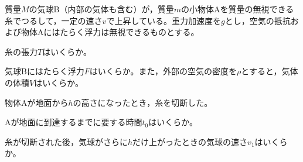 \item
\begin{mawarikomi}{50pt}{}
質量$M$の気球B（内部の気体も含む）が，質量$m$の小物体Aを質量の無視できる糸でつるして，一定の速さ$v$で上昇している。重力加速度を$g$とし，空気の抵抗および物体Aにはたらく浮力は無視できるものとする。
    \begin{Enumerate}
        \item 糸の張力$T$はいくらか。
        \item 気球Bにはたらく浮力$F$はいくらか。また，外部の空気の密度を$\rho$とすると，気体の体積$V$はいくらか。
    \end{Enumerate}
    物体Aが地面から$h$の高さになったとき，糸を切断した。
    \begin{Enumerate*}
        \item Aが地面に到達するまでに要する時間$t_0$はいくらか。
        \item 糸が切断された後，気球がさらに$h$だけ上がったときの気球の速さ$v_1$はいくらか。
    \end{Enumerate*}
\end{mawarikomi}

